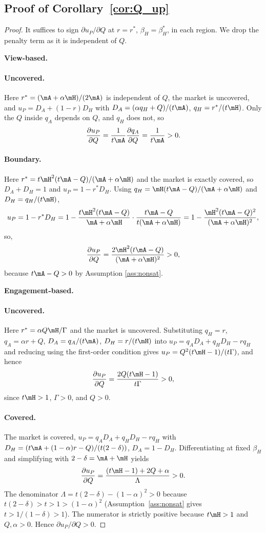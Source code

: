  
 \subsection*{Proof of Corollary~\ref{cor:Q_up}}
\begin{proof}
It suffices to sign $\partial u_P/\partial Q$ at $r=r^*$,
$\beta_H=\beta_H^*$, in each region. We drop the penalty term as it is independent of $Q$.


\textbf{View-based.}
\paragraph{Uncovered.} Here $r^*=(\mA+\alpha\mH)/(2\mA)$ is
independent of $Q$, the market is uncovered, and
$u_P=D_A+(1-r)D_H$ with $D_A=(\alpha q_H+Q)/(t\mA)$,
$q_H=r^*/(t\mH)$. Only the $Q$ inside $q_A$ depends on
$Q$, and $q_H$ does not, so
\[
\frac{\partial u_P}{\partial Q}=\frac{1}{t\mA}\frac{\partial q_A}{\partial Q}=\frac{1}{t\mA}>0.
\]

\paragraph{Boundary.} Here $r^*=t\mH^2(t\mA-Q)/(\mA+\alpha\mH)$ and
the market is exactly covered, so $D_A+D_H=1$ and
$u_P=1-r^*D_H$.
Using $q_H=\mH (t\mA-Q)/(\mA+\alpha\mH)$ and $D_H=q_H/(t\mH)$,
\[
u_P=1-r^*D_H=1-\frac{t\mH^2(t\mA-Q)}{\mA+\alpha\mH}\cdot\frac{t\mA-Q}{t(\mA+\alpha\mH)}=1-\frac{\mH^2(t\mA-Q)^2}{(\mA+\alpha\mH)^2},
\]
so,
\[
\frac{\partial u_P}{\partial Q}=\frac{2\mH^2(t\mA-Q)}{(\mA+\alpha\mH)^2}>0,
\]
because $t\mA-Q>0$ by Assumption \ref{ass:nonsat}.

\textbf{Engagement-based.}
\paragraph{Uncovered.} Here $r^*=\alpha Q\mH/\Gamma$
and the market is uncovered. Substituting $q_H=r$, $q_A=\alpha r+Q$,
$D_A=q_A/(t\mA)$, $D_H=r/(t\mH)$ into
$u_P=q_AD_A+q_HD_H-rq_H$ and reducing using the first-order condition
 gives
$u_P=Q^2(t\mH-1)/(t\Gamma)$, and hence
\[
\frac{\partial u_P}{\partial Q}=\frac{2Q(t\mH-1)}{t\Gamma}>0,
\]
since $t\mH>1$, $\Gamma>0$, and $Q>0$.

\paragraph{Covered.}
The market is covered, $u_P=q_AD_A+q_HD_H-rq_H$ with
$D_H=(t\mA+(1-\alpha)r-Q)/(t(2-\delta))$, $D_A=1-D_H$. Differentiating
at fixed $\beta_H$ and simplifying with $2-\delta=\mA+\mH$ yields
\[
\frac{\partial u_P}{\partial Q}=\frac{(t\mH-1)+2Q+\alpha}{\Lambda}>0.
\]
The denominator $\Lambda=t(2-\delta)-(1-\alpha)^2>0$ because
$t(2-\delta)>t>1>(1-\alpha)^2$ (Assumption~\ref{ass:nonsat} gives
$t>1/(1-\delta)>1$). The numerator is strictly positive because
$t\mH>1$ and $Q,\alpha>0$. Hence $\partial u_P/\partial Q>0$.


\end{proof}

